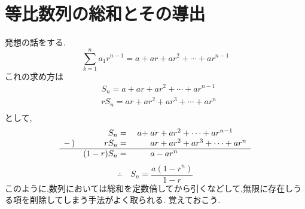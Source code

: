 
\section{等比数列の総和とその導出}\label{節：等比数列の総和とその導出}
  発想の話をする.
  \[
    \sum_{k=1}^{n} a_1r^{n-1}=a+ar+ar^2+\cdots+ar^{n-1}
  \]
  これの求め方は
  \begin{align*}
    &S_{n}=a+ar+ar^2+\cdots+ar^{n-1} \tag*{\(\cdots\) (1)}\\
    &rS_n=ar+ar^2+ar^3+\cdots+ar^{n} \tag*{\(\cdots\) (2)}\\
  \end{align*}
  として,
  \[
  \begin{array}{rrrl}
      &S_{n}={}&a+&\hspace{-0.75em}ar+ar^2+\cdots+ar^{n-1}\\
    -\,) & rS_n={}&{}&\hspace{-0.75em}ar+ar^2+ar^3+\cdots+ar^{n}\\ \hline
      & (1-r)S_n={}&{}&\hspace{-0.75em}a-ar^n
  \end{array}
  \]
  \[
    \therefore \quad S_n=\frac{a(1-r^n)}{1-r}
  \]
  このように,数列においては総和を定数倍してから引くなどして,無限に存在しうる項を削除してしまう手法がよく取られる.
  覚えておこう.

